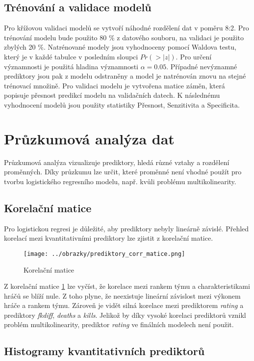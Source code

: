 \subsection{Trénování a validace modelů}
Pro křížovou validaci modelů se vytvoří náhodné rozdělení dat v poměru 8:2. Pro trénování modelu bude použito 80 \% z datového souboru, na validaci je použito zbylých 20 \%.
Natrénované modely jsou vyhodnoceny pomocí Waldova testu, který je v každé tabulce v posledním sloupci $Pr(>|z|)$. Pro určení významnosti je použitá hladina významnosti
$\alpha = 0.05$. Případné nevýznamné prediktory jsou pak z modelu odstraněny a model je natrénován znovu na stejné trénovací množině. Pro validaci modelu je vytvořena
matice záměn, která popisuje přesnost predikcí modelu na validačních datech. K následnému vyhodnocení modelů jsou použity statistiky Přesnost, Senzitivita a Specificita. 

\newpage
\section{Průzkumová analýza dat}
Průzkumová analýza vizualizuje prediktory, hledá různé vztahy a rozdělení proměnných. Díky průzkumu lze určit, které proměnné není vhodné použít pro tvorbu
logistického regresního modelu, např. kvůli problému multikolinearity.

\subsection{Korelační matice}
Pro logistickou regresi je důležité, aby prediktory nebyly lineárně závislé. Přehled korelací mezi kvantitativními prediktory lze zjistit z korelační matice.

\begin{figure}[H]
    \centering
    \texttt{[image: ../obrazky/prediktory\_corr\_matice.png]}
    \caption{Korelační matice} 
    \label{fig:korelacni_matice}
\end{figure}

Z korelační matice \ref{fig:korelacni_matice} lze vyčíst, že korelace mezi rankem týmu a charakteristikami hráčů se blíží nule. Z toho plyne, že neexistuje lineární závislost mezi
výkonem hráče a rankem týmu. Zároveň je vidět silná korelace mezi prediktorem \textit{rating} a prediktory \textit{fkdiff}, \textit{deaths} a \textit{kills}.
Jelikož by díky vysoké korelaci prediktorů vznikl problém multikolinearity, prediktor \textit{rating} ve finálních modelech není použit.

\subsection{Histogramy kvantitativních prediktorů}

